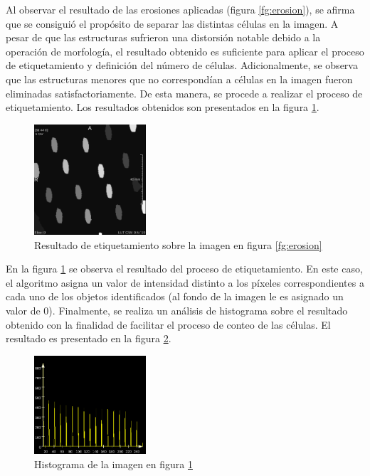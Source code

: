 \documentclass{article}
\begin{document}
Al observar el resultado de las erosiones aplicadas (figura \ref{fg:erosion}), se afirma que se consigui\'{o} el prop\'{o}sito de separar las distintas c\'{e}lulas en la imagen. A pesar de que las estructuras sufrieron una distorsi\'{o}n notable debido a la operaci\'{o}n de morfolog\'{i}a, el resultado obtenido es suficiente para aplicar el proceso de etiquetamiento y definici\'{o}n del n\'{u}mero de c\'{e}lulas. Adicionalmente, se observa que las estructuras menores que no correspond\'{i}an a c\'{e}lulas en la imagen fueron eliminadas satisfactoriamente. De esta manera, se procede a realizar el proceso de etiquetamiento. Los resultados obtenidos son presentados en la figura \ref{fg:etiquetas}.

\begin{figure}[ht]
\begin{center}
\includegraphics[width=0.37\textwidth]{1Etiquetado/1_img5} %
\caption{Resultado de etiquetamiento sobre la imagen en figura \ref{fg:erosion}}
\label{fg:etiquetas}
\end{center}
\end{figure}
\FloatBarrier

En la figura \ref{fg:etiquetas} se observa el resultado del proceso de etiquetamiento. En este caso, el algoritmo asigna un valor de intensidad distinto a los p\'{i}xeles correspondientes a cada uno de los objetos identificados (al fondo de la imagen le es asignado un valor de 0). Finalmente, se realiza un an\'{a}lisis de histograma sobre el resultado obtenido con la finalidad de facilitar el proceso de conteo de las c\'{e}lulas. El resultado es presentado en la figura \ref{fg:histograma}.

\begin{figure}[ht]
\begin{center}
\includegraphics[width=0.37\textwidth]{1Etiquetado/1_img6} %
\caption{Histograma de la imagen en figura \ref{fg:etiquetas}}
\label{fg:histograma}
\end{center}
\end{figure}
\FloatBarrier
\end{document}
